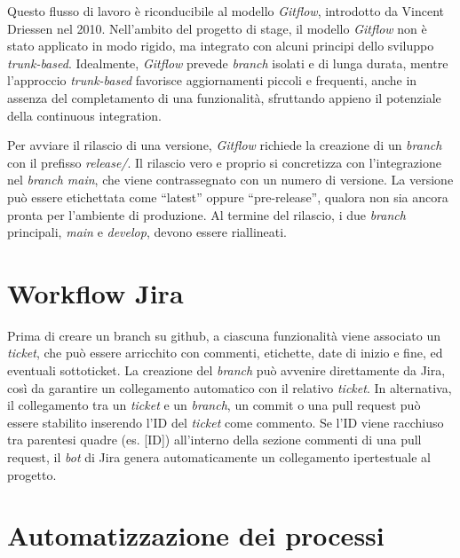 \vspace{10pt}
\noindent Questo flusso di lavoro è riconducibile al modello \textit{Gitflow}, introdotto da Vincent Driessen nel 2010. Nell’ambito del progetto di stage, il modello \textit{Gitflow} non è stato applicato in modo rigido, ma integrato con alcuni principi dello sviluppo \textit{trunk-based}. Idealmente, \textit{Gitflow} prevede \textit{branch} isolati e di lunga durata, mentre l’approccio \textit{trunk-based} favorisce aggiornamenti piccoli e frequenti, anche in assenza del completamento di una funzionalità, sfruttando appieno il potenziale della \gls{continuous integration}.

\vspace{10pt}
\noindent Per avviare il rilascio di una versione, \textit{Gitflow} richiede la creazione di un \textit{branch} con il prefisso \textit{release/}. Il rilascio vero e proprio si concretizza con l’integrazione nel \textit{branch main}, che viene contrassegnato con un numero di versione. La versione può essere etichettata come “latest” oppure “pre-release”, qualora non sia ancora pronta per l’ambiente di produzione. Al termine del rilascio, i due \textit{branch} principali, \textit{main} e \textit{develop}, devono essere riallineati.

\section{Workflow Jira}

Prima di creare un branch su \gls{github}, a ciascuna funzionalità viene associato un \textit{ticket}, che può essere arricchito con commenti, etichette, date di inizio e fine, ed eventuali sottoticket. La creazione del \textit{branch} può avvenire direttamente da Jira, così da garantire un collegamento automatico con il relativo \textit{ticket}. In alternativa, il collegamento tra un \textit{ticket} e un \textit{branch}, un \gls{commit} o una \gls{pull request} può essere stabilito inserendo l’ID del \textit{ticket} come commento. Se l’ID viene racchiuso tra parentesi quadre (es. [ID]) all’interno della sezione commenti di una \gls{pull request}, il \textit{bot} di Jira genera automaticamente un collegamento ipertestuale al progetto.

\section{Automatizzazione dei processi}

